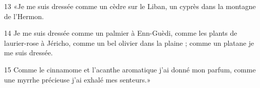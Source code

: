 13 «Je me suis dressée comme un cèdre sur le Liban, un cyprès dans la montagne de l’Hermon.

14 Je me suis dressée comme un palmier à Enn-Guèdi, comme les plants de laurier-rose à Jéricho, comme un bel olivier dans la plaine ; comme un platane je me suis dressée.

15 Comme le cinnamome et l’acanthe aromatique j’ai donné mon parfum, comme une myrrhe précieuse j’ai exhalé mes senteurs.»